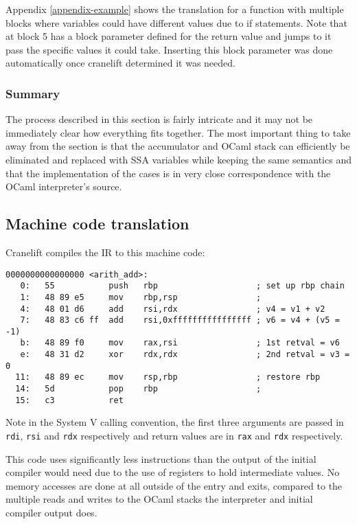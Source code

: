 Appendix \ref{appendix-example} shows the translation for a function with multiple blocks where
variables could have different values due to if statements.  Note that at block 5 has a block
parameter defined for the return value and jumps to it pass the specific values it could take.
Inserting this block parameter was done automatically once cranelift determined it was needed.

\subsubsection{Summary}

The process described in this section is fairly intricate and it may not be immediately clear how
everything fits together. The most important thing to take away from the section is that the
accumulator and OCaml stack can efficiently be eliminated and replaced with SSA variables while
keeping the same semantics and that the implementation of the cases is in very close correspondence
with the OCaml interpreter's source.

\subsection{Machine code translation}

Cranelift compiles the IR to this machine code:

\begin{verbatim}
0000000000000000 <arith_add>:
   0:	55           push   rbp                    ; set up rbp chain
   1:	48 89 e5     mov    rbp,rsp                ;  
   4:	48 01 d6     add    rsi,rdx                ; v4 = v1 + v2
   7:	48 83 c6 ff  add    rsi,0xffffffffffffffff ; v6 = v4 + (v5 = -1)
   b:	48 89 f0     mov    rax,rsi                ; 1st retval = v6
   e:	48 31 d2     xor    rdx,rdx                ; 2nd retval = v3 = 0
  11:	48 89 ec     mov    rsp,rbp                ; restore rbp
  14:	5d           pop    rbp                    ;
  15:	c3           ret    
\end{verbatim}

Note in the System V calling convention, the first three arguments are passed in \texttt{rdi},
\texttt{rsi} and \texttt{rdx} respectively and return values are in \texttt{rax} and
\texttt{rdx} respectively.

This code uses significantly less instructions than the output of the initial compiler would need
due to the use of registers to hold intermediate values. No memory accesses are
done at all outside of the entry and exits, compared to the multiple reads and writes to the OCaml
stacks the interpreter and initial compiler output does.


